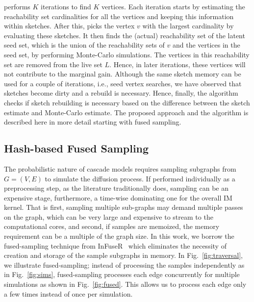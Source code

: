 \documentclass[final,5p,times,twocolumn]{elsarticle}
\newcommand\acro{{\sc{HyperFuseR\xspace}\xspace}\xspace}
\newcommand\kktodo[1]{\textcolor{red}{#1}}
\newcommand\ggx[1]{\textcolor{blue}{#1}}
\newcommand\fixme[1]{#1}
\begin{document}
\acro performs $K$ iterations to find $K$ vertices. Each iteration starts by estimating the reachability set cardinalities for all the vertices and keeping this information within sketches. After this, \acro picks the vertex $v$ with the largest cardinality by evaluating these sketches. It then finds the (actual) reachability set of the latent seed set, which is the union of the reachability sets of $v$ and the vertices in the seed set, by performing Monte-Carlo simulations. The vertices in this reachability set are removed from the live set $L$. %
Hence, in later iterations, these vertices will not contribute to the marginal gain. Although the same sketch memory can be used for a couple of iterations, i.e., seed vertex searches, we have observed that sketches become dirty and a rebuild is necessary. Hence, finally, the algorithm checks if sketch rebuilding is necessary based on the difference between the sketch estimate and Monte-Carlo estimate. The proposed approach and the algorithm is described here in more detail starting with fused sampling.%

\subsection{Hash-based Fused Sampling}
The probabilistic nature of cascade models \fixme{requires} sampling \fixme{subgraphs from $G = (V, E)$ to simulate the diffusion process}. If performed individually as a preprocessing step, as the literature traditionally does, sampling can be an expensive stage, furthermore, a time-wise dominating one for the overall IM kernel. That is first, sampling multiple sub-graphs may demand multiple passes on the graph, which can be very large and expensive to stream to the computational cores, and second, if samples are memoized, the memory requirement can be a multiple of the graph size. 
In this work, we borrow the fused-sampling technique from {\sc InFuseR}~\cite{infuser} which eliminates the necessity of creation and storage of the sample subgraphs in memory. 
In Fig.~\ref{fig:traversal}, we illustrate fused-sampling; instead of processing the samples independently as in Fig.~\ref{fig:sims}, fused-sampling processes each edge concurrently for multiple simulations as shown in Fig.~\ref{fig:fused}. This allows us to process each edge only a few times instead of once per simulation.
\end{document}
